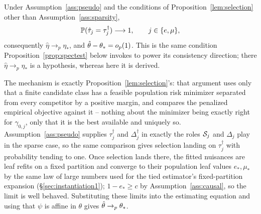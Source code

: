 \documentclass[12pt]{article}
\begin{document}
\begin{proposition}
\label{prop:pseudo-consistency}
Under Assumption~\ref{ass:pseudo} and the conditions of Proposition~\ref{lem:selection} other than Assumption~\ref{ass:sparsity},
\[
  \mathbb{P}(\hat{\tau}_j=\tau_j^\dagger)\longrightarrow 1, \qquad j\in\{e,\mu\},
\]
consequently $\hat\eta\to_p\eta_*$, and $\hat{\theta}-\theta_*=o_p(1)$. This is the same condition Proposition~\ref{prop:spectest} below invokes to power its consistency direction; there $\hat\eta\to_p\eta_*$ is a hypothesis, whereas here it is derived.
\end{proposition}

The mechanism is exactly Proposition~\ref{lem:selection}'s: that argument uses only that a finite candidate class has a feasible population risk minimizer separated from every competitor by a positive margin, and compares the penalized empirical objective against it -- nothing about the minimizer being exactly right for $\gamma_{0,j}$, only that it is the best available and uniquely so. Assumption~\ref{ass:pseudo} supplies $\tau_j^\dagger$ and $\Delta_j^\dagger$ in exactly the roles $\mathcal{S}_j$ and $\Delta_j$ play in the sparse case, so the same comparison gives selection landing on $\tau_j^\dagger$ with probability tending to one. Once selection lands there, the fitted nuisances are leaf refits on a fixed partition and converge to their population leaf values $e_*,\mu_*$ by the same law of large numbers used for the tied estimator's fixed-partition expansion (\S\ref{sec:instantiation1}); $1-e_*\ge c$ by Assumption~\ref{ass:causal}, so the limit is well behaved. Substituting these limits into the estimating equation and using that $\psi$ is affine in $\theta$ gives $\hat{\theta}\to_p\theta_*$.
\end{document}
